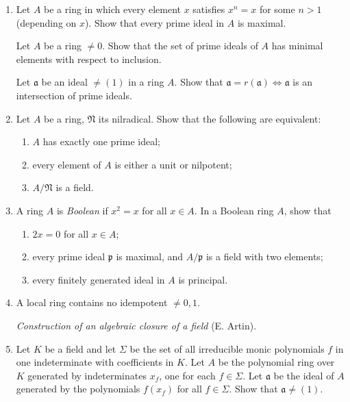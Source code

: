 \begin{enumerate}
\amstaritem A ring $A$ is such that every ideal not contained in the nilradical contains a non-zero idempotent (that is, an element $e$ such that $e^2=e\neq0$). Prove that the nilradical and Jacobson radical of $A$ are equal.

\item Let $A$ be a ring in which every element $x$ satisfies $x^n=x$ for some $n>1$ (depending on $x$). Show that every prime ideal in $A$ is maximal.

\amstaritem Let $A$ be a ring $\neq0$. Show that the set of prime ideals of $A$ has minimal elements with respect to inclusion.

\amstaritem Let $\mathfrak a$ be an ideal $\neq(1)$ in a ring $A$. Show that $\mathfrak a=r(\mathfrak a)\Longleftrightarrow\mathfrak a$ is an intersection of prime ideals.

\item Let $A$ be a ring, $\mathfrak N$ its nilradical. Show that the following are equivalent:
\begin{enumerate}
\renewcommand{\labelenumii}{\roman{enumii})}
\item $A$ has exactly one prime ideal;
\item every element of $A$ is either a unit or nilpotent;
\item $A/\mathfrak N$ is a field.
\end{enumerate}

\item A ring $A$ is \textit{Boolean} if $x^2=x$ for all $x\in A$. In a Boolean ring $A$, show that
\begin{enumerate}
\renewcommand{\labelenumii}{\roman{enumii})}
\item $2x=0$ for all $x\in A$;
\item every prime ideal $\mathfrak p$ is maximal, and $A/\mathfrak p$ is a field with two elements;
\item every finitely generated ideal in $A$ is principal.
\end{enumerate}

\item A local ring contains no idempotent $\neq0,1$.

\noindent\textit{Construction of an algebraic closure of a field} (E. Artin).

\item Let $K$ be a field and let $\Sigma$ be the set of all irreducible monic polynomials $f$ in one indeterminate with coefficients in $K$. Let $A$ be the polynomial ring over $K$ generated by indeterminates $x_f$, one for each $f\in\Sigma$. Let $\mathfrak a$ be the ideal of $A$ generated by the polynomials $f(x_f)$ for all $f\in\Sigma$. Show that $\mathfrak a\neq(1)$.


\end{enumerate}

